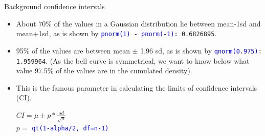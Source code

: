 \documentclass[xcolor=table,       handout,    xcolor=dvipsnames]{beamer}\usepackage[]{graphicx}\usepackage[]{color}
\newcommand{\rcode}[1]{\texttt{\textcolor{Blue}{#1}}} %
\begin{document}
\begin{frame}{Background confidence intervals}
\pause
\begin{itemize}[<+->]
  \item About 70\% of the values in a Gaussian distribution lie between mean-1sd and mean+1sd, as is shown by \rcode{pnorm(1) - pnorm(-1)}\texttt{: 0.6826895}.\\
  \item 95\% of the values are between mean $\pm$ 1.96 sd, as is shown by \rcode{qnorm(0.975)}\texttt{: 1.959964}. (As the bell curve is symmetrical, we want to know below what value 97.5\% of the values are in the cumulated density).\\
  \item This is the famous parameter in calculating the limits of confidence intervals (CI).
\begin{center}
$CI =  \mu \pm p*\frac{sd}{\sqrt{n}}$\\[1ex] %
$p = $ \rcode{qt(1-alpha/2,  df=n-1)}
\end{center}
\end{itemize}
\end{frame}
\end{document}
